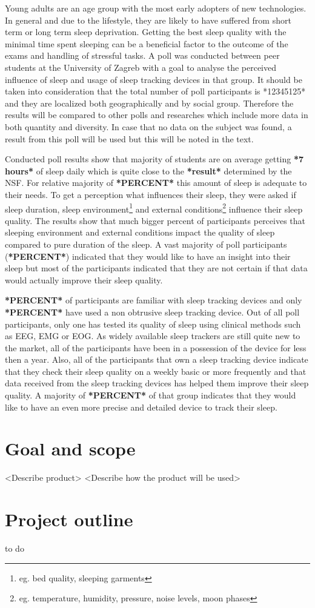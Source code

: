 Young adults are an age group with the most early adopters of new technologies. In general and due to the lifestyle, they are likely to have suffered from short term or long term sleep deprivation. Getting the best sleep quality with the minimal time spent sleeping can be a beneficial factor to the outcome of the exams and handling of stressful tasks. A poll was conducted between peer students at the University of Zagreb with a goal to analyse the perceived influence of sleep and usage of sleep tracking devices in that group. It should be taken into consideration that the total number of poll participants is *12345125* and they are localized both geographically and by social group. Therefore the results will be compared to other polls and researches which include more data in both quantity and diversity. In case that no data on the subject was found, a result from this poll will be used but this will be noted in the text.

Conducted poll results show that majority of students are on average getting \textbf{*7 hours*} of sleep daily which is quite close to the \textbf{*result*} determined by the NSF\cite{NSF}. For relative majority of \textbf{*PERCENT*} this amount of sleep is adequate to their needs. To get a perception what influences their sleep, they were asked if sleep duration, sleep environment\footnote{eg. bed quality, sleeping garments} and external conditions\footnote{eg. temperature, humidity, pressure, noise levels, moon phases} influence their sleep quality. The results show that much bigger percent of participants perceives that sleeping environment and external conditions impact the quality of sleep compared to pure duration of the sleep. A vast majority of poll participants (\textbf{*PERCENT*}) indicated that they would like to have an insight into their sleep but most of the participants indicated that they are not certain if that data would actually improve their sleep quality. 

\textbf{*PERCENT*} of participants are familiar with sleep tracking devices and only \textbf{*PERCENT*} have used a non obtrusive sleep tracking device. Out of all poll participants, only one has tested its quality of sleep using clinical methods such as \ac{EEG}, \ac{EMG} or \ac{EOG}. As widely available sleep trackers are still quite new to the market, all of the participants have been in a possession of the device for less then a year. Also, all of the participants that own a sleep tracking device indicate that they check their sleep quality on a weekly basic or more frequently and that data received from the sleep tracking devices has helped them improve their sleep quality. A majority of \textbf{*PERCENT*} of that group indicates that they would like to have an even more precise and detailed device to track their sleep.


\section{Goal and scope}

<Describe product>
<Describe how the product will be used>

\section{Project outline}
to do
